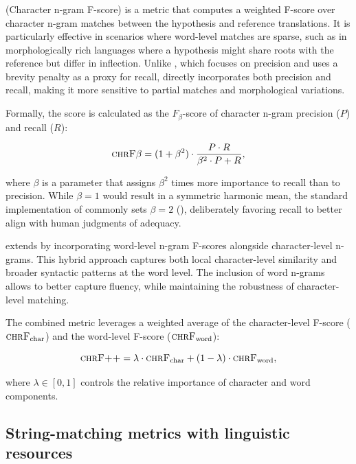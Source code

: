 \subsubsection{\chrf}
\chrf (Character n-gram F-score) \citep{popovic-2015-chrf} is a metric that computes a weighted F-score over character n-gram matches between the hypothesis and reference translations. It is particularly effective in scenarios where word-level matches are sparse, such as in morphologically rich languages where a hypothesis might share roots with the reference but differ in inflection. Unlike \bleu, which focuses on precision and uses a brevity penalty as a proxy for recall, \chrf directly incorporates both precision and recall, making it more sensitive to partial matches and morphological variations.

Formally, the \chrf score is calculated as the $F_\beta$-score of  character n-gram precision ($P$) and recall ($R$):

$$\text{\textsc{chrF}}\beta = (1 + \beta^2) \cdot \frac{P \cdot R}{\beta^2 \cdot P + R} ,$$
 
where $\beta$ is a parameter that assigns $\beta^2$ times more importance to recall than to precision. While $\beta = 1$ would result in a symmetric harmonic mean, the standard implementation of \chrf commonly sets  $\beta = 2$ (), deliberately favoring recall to better align with human judgments of adequacy.

\chrfp \citep{popovic-2017-chrf} extends \chrf by incorporating word-level n-gram F-scores alongside  character-level n-grams. This hybrid approach captures both local character-level similarity and broader syntactic patterns at the word level. The inclusion of word n-grams allows \chrfp to better capture fluency, while maintaining the robustness of character-level matching. 

The combined metric leverages a weighted average of the character-level F-score ($\text{\textsc{chrF}}_{\text{char}}$) and the word-level F-score ($\text{\textsc{chrF}}_{\text{word}}$):

$$\text{\textsc{chrF++}} = \lambda \cdot \text{\textsc{chrF}}_{\text{char}} + (1 - \lambda) \cdot \text{\textsc{chrF}}_{\text{word}},$$

where $\lambda \in [0,1]$ controls the relative importance of character and word components.

\subsection{String-matching metrics with linguistic resources}

